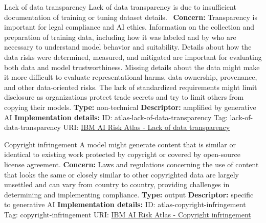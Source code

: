 \documentclass[a4paper,12pt]{article}
\begin{document}
\begin{definitionbox}{Lack of data transparency}
Lack of data transparency is due to insufficient documentation of training or tuning dataset details. \newline\newline
\textbf{Concern: }Transparency is important for legal compliance and AI ethics. Information on the collection and preparation of training data, including how it was labeled and by who are necessary to understand model behavior and suitability. Details about how the data risks were determined, measured, and mitigated are important for evaluating both data and model trustworthiness. Missing details about the data might make it more difficult to evaluate representational harms, data ownership, provenance, and other data-oriented risks. The lack of standardized requirements might limit disclosure as organizations protect trade secrets and try to limit others from copying their models.\newline\newline
\textbf{Type: }non-technical\newline
\textbf{Descriptor: }amplified by generative AI \newline\newline
\textbf{Implementation details: } \newline
ID: atlas-lack-of-data-transparency \newline
Tag: lack-of-data-transparency \newline
URI:  \href{https://www.ibm.com/docs/en/watsonx/saas?topic=SSYOK8/wsj/ai-risk-atlas/lack-of-data-transparency.html}{IBM AI Risk Atlas - Lack of data transparency}\newline
\end{definitionbox}
\begin{definitionbox}{Copyright infringement}
A model might generate content that is similar or identical to existing work protected by copyright or covered by open-source license agreement.\newline\newline
\textbf{Concern: }Laws and regulations concerning the use of content that looks the same or closely similar to other copyrighted data are largely unsettled and can vary from country to country, providing challenges in determining and implementing compliance.\newline\newline
\textbf{Type: }output\newline
\textbf{Descriptor: }specific to generative AI \newline\newline
\textbf{Implementation details: } \newline
ID: atlas-copyright-infringement \newline
Tag: copyright-infringement \newline
URI:  \href{https://www.ibm.com/docs/en/watsonx/saas?topic=SSYOK8/wsj/ai-risk-atlas/copyright-infringement.html}{IBM AI Risk Atlas - Copyright infringement}\newline
\end{definitionbox}
\end{document}
